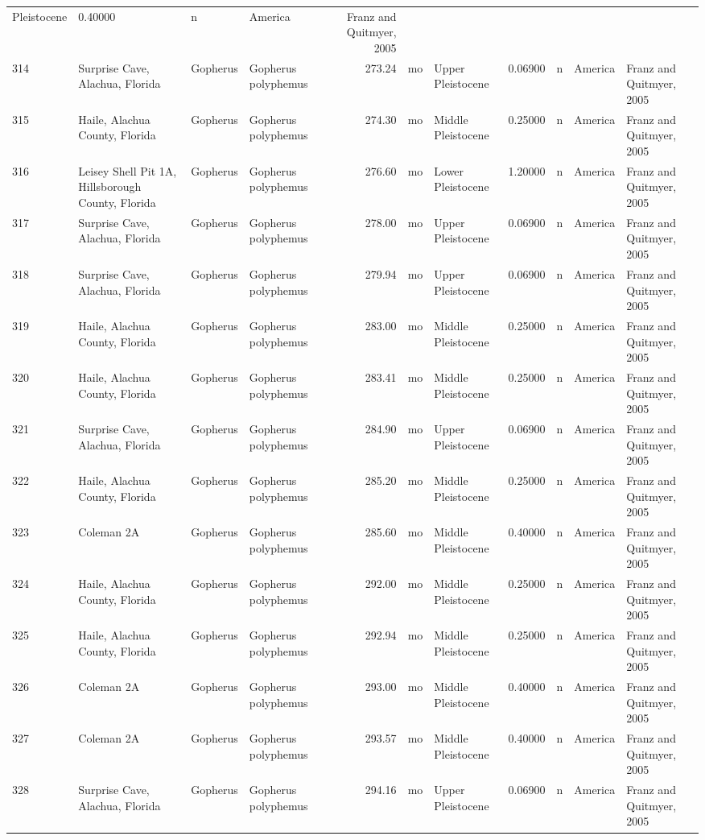 \documentclass[]{article}
\begin{document}
\begin{longtable}[]{@{}llllrllrlll@{}}
Pleistocene & 0.40000 & n & America & Franz and Quitmyer,
2005\tabularnewline
314 & Surprise Cave, Alachua, Florida & Gopherus & Gopherus polyphemus &
273.24 & mo & Upper Pleistocene & 0.06900 & n & America & Franz and
Quitmyer, 2005\tabularnewline
315 & Haile, Alachua County, Florida & Gopherus & Gopherus polyphemus &
274.30 & mo & Middle Pleistocene & 0.25000 & n & America & Franz and
Quitmyer, 2005\tabularnewline
316 & Leisey Shell Pit 1A, Hillsborough County, Florida & Gopherus &
Gopherus polyphemus & 276.60 & mo & Lower Pleistocene & 1.20000 & n &
America & Franz and Quitmyer, 2005\tabularnewline
317 & Surprise Cave, Alachua, Florida & Gopherus & Gopherus polyphemus &
278.00 & mo & Upper Pleistocene & 0.06900 & n & America & Franz and
Quitmyer, 2005\tabularnewline
318 & Surprise Cave, Alachua, Florida & Gopherus & Gopherus polyphemus &
279.94 & mo & Upper Pleistocene & 0.06900 & n & America & Franz and
Quitmyer, 2005\tabularnewline
319 & Haile, Alachua County, Florida & Gopherus & Gopherus polyphemus &
283.00 & mo & Middle Pleistocene & 0.25000 & n & America & Franz and
Quitmyer, 2005\tabularnewline
320 & Haile, Alachua County, Florida & Gopherus & Gopherus polyphemus &
283.41 & mo & Middle Pleistocene & 0.25000 & n & America & Franz and
Quitmyer, 2005\tabularnewline
321 & Surprise Cave, Alachua, Florida & Gopherus & Gopherus polyphemus &
284.90 & mo & Upper Pleistocene & 0.06900 & n & America & Franz and
Quitmyer, 2005\tabularnewline
322 & Haile, Alachua County, Florida & Gopherus & Gopherus polyphemus &
285.20 & mo & Middle Pleistocene & 0.25000 & n & America & Franz and
Quitmyer, 2005\tabularnewline
323 & Coleman 2A & Gopherus & Gopherus polyphemus & 285.60 & mo & Middle
Pleistocene & 0.40000 & n & America & Franz and Quitmyer,
2005\tabularnewline
324 & Haile, Alachua County, Florida & Gopherus & Gopherus polyphemus &
292.00 & mo & Middle Pleistocene & 0.25000 & n & America & Franz and
Quitmyer, 2005\tabularnewline
325 & Haile, Alachua County, Florida & Gopherus & Gopherus polyphemus &
292.94 & mo & Middle Pleistocene & 0.25000 & n & America & Franz and
Quitmyer, 2005\tabularnewline
326 & Coleman 2A & Gopherus & Gopherus polyphemus & 293.00 & mo & Middle
Pleistocene & 0.40000 & n & America & Franz and Quitmyer,
2005\tabularnewline
327 & Coleman 2A & Gopherus & Gopherus polyphemus & 293.57 & mo & Middle
Pleistocene & 0.40000 & n & America & Franz and Quitmyer,
2005\tabularnewline
328 & Surprise Cave, Alachua, Florida & Gopherus & Gopherus polyphemus &
294.16 & mo & Upper Pleistocene & 0.06900 & n & America & Franz and
Quitmyer, 2005\tabularnewline

\end{longtable}
\end{document}
